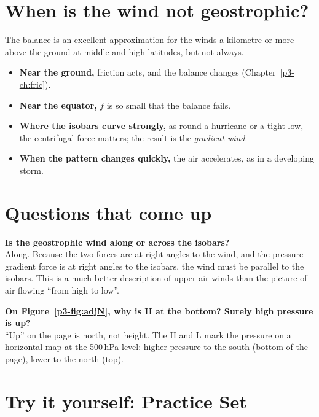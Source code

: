 \section{When is the wind not geostrophic?}

The balance is an excellent approximation for the winds a kilometre or more above the ground at middle and high latitudes, but not always.
\begin{itemize}
\item \textbf{Near the ground,} friction acts, and the balance changes (Chapter~\ref{p3-ch:fric}).
\item \textbf{Near the equator,} $f$ is so small that the balance fails.
\item \textbf{Where the isobars curve strongly,} as round a hurricane or a tight low, the centrifugal force matters; the result is the \emph{gradient wind}.
\item \textbf{When the pattern changes quickly,} the air accelerates, as in a developing storm.
\end{itemize}

\section{Questions that come up}

\begin{askbox}
\textbf{Is the geostrophic wind along or across the isobars?}\\
Along. Because the two forces are at right angles to the wind, and the pressure gradient force is at right angles to the isobars, the wind must be parallel to the isobars. This is a much better description of upper-air winds than the picture of air flowing ``from high to low''.
\end{askbox}

\begin{askbox}
\textbf{On Figure~\ref{p3-fig:adjN}, why is H at the bottom? Surely high pressure is up?}\\
``Up'' on the page is north, not height. The H and L mark the pressure on a horizontal map at the 500\,hPa level: higher pressure to the south (bottom of the page), lower to the north (top).
\end{askbox}

\section{Try it yourself: Practice Set~\thechapter}

